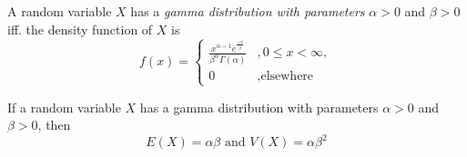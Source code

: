 \begin{definition}
    A random variable $X$ has a \emph{gamma distribution with parameters} 
    $\alpha > 0$ and $\beta > 0$ iff. the density function of $X$ is
    \[
        f(x) =
        \begin{cases}
        \frac{x^{\alpha - 1}e^{\frac{-x}{\beta}}}{\beta^\alpha\Gamma(\alpha)} &, 0 \leq x < \infty,\\
        0&, \text{elsewhere}
        \end{cases} 
    \]
\end{definition}

\begin{theorem}
    If a random variable $X$ has a gamma distribution with parameters $\alpha > 0$  and $\beta > 0$, then
    \[
    E(X) = \alpha\beta \text{ and } V(X) = \alpha\beta^2
    \]
\end{theorem}

